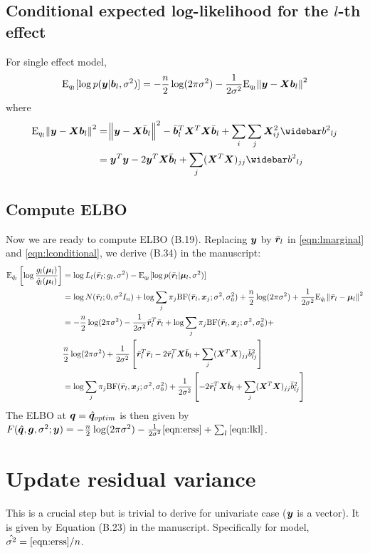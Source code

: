 \subsection{Conditional expected log-likelihood for the $l$-th effect}

For single effect model,
\begin{equation}
    \text{E}_{q_l}[\log p(\bm y|\bm b_l,\sigma^2)] = -\frac{n}{2}\log(2\pi\sigma^2) - \frac{1}{2\sigma^2}\text{E}_{q_l}\norm{\bm y - \bm X\bm b_l}^2  \label{eqn:lconditional}
\end{equation}
where
\begin{align}
    \E_{q_l}\norm{\vy - \mx\vb_l}^2 &= \norm{\vy - \mx \vbb_l}^2 - \vbb_l^T\mx^T\mx \vbb_l + \sum_i \sum_j \mx_{ij}^2 \bbb_{lj} \\
    &= \vy^T\vy -2 \vy^T \mx \vbb_l  + \sum_j (\mx^T \mx)_{jj} \bbb_{lj}
\end{align}

\subsection{Compute ELBO}
Now we are ready to compute ELBO (B.19).
Replacing $\bm y$ by $\bar{\bm r}_l$ in \eqref{eqn:lmarginal} and \eqref{eqn:lconditional}, we derive (B.34) in the manuscript:
\begin{align}
    \text{E}_{\hat{q}_l} \left[ \log \frac{g_l(\bm \mu_l)}{\hat{q}_l(\bm \mu_l)} \right] &= \log L_l(\bar{\bm r}_l; g_l,\sigma^2) - \text{E}_{q_l}[\log p(\bar{\bm r}_l|\bm \mu_l,\sigma^2)]  \\
    &= \log N(\bar{\bm r}_l; 0, \sigma^2 I_n) + \log \sum_j \pi_j \text{BF}(\bar{\bm r}_l, \bm x_j; \sigma^2, \sigma^2_0) + \frac{n}{2} \log(2\pi\sigma^2) +\frac{1}{2\sigma^2}\text{E}_{\hat{q}_l}\norm{\bar{\bm r}_l-\bm \mu_l}^2 \\
    &= -\frac{n}{2} \log(2\pi\sigma^2) -\frac{1}{2\sigma^2}\bar{\bm r}_l^T\bar{\bm r}_l + \log \sum_j \pi_j \text{BF}(\bar{\bm r}_l, \bm x_j; \sigma^2, \sigma^2_0) + \\
    & \frac{n}{2} \log(2\pi\sigma^2) +\frac{1}{2\sigma^2}\left[\bar{\bm r}_l^T\bar{\bm r}_l - 2\bar{\bm r}_l^T\bm X \bar{\bm b}_l + \sum_j (\bm X^T \bm X)_{jj} \bar{b}_{lj}^2 \right] \\
    &= \log \sum_j \pi_j \text{BF}(\bar{\bm r}_l, \bm x_j; \sigma^2, \sigma^2_0) + \frac{1}{2\sigma^2}\left[- 2\bar{\bm r}_l^T\bm X \bar{\bm b}_l + \sum_j (\bm X^T \bm X)_{jj} \bar{b}_{lj}^2\right] \label{eqn:lkl}
\end{align}
The ELBO at ${\bm q} = \hat{{\bm q}}_{optim}$ is then given by $F(\hat{{\bm q}},\bm g,\sigma^2; \bm y) = -\frac{n}{2} \log(2\pi\sigma^2) - \frac{1}{2\sigma^2} \eqref{eqn:erss} + \sum_l \eqref{eqn:lkl}$.

\section{Update residual variance}
This is a crucial step but is trivial to derive for univariate case ($\bm y$ is a vector). It is given by Equation (B.23) in the manuscript. Specifically for \susie model, $\hat{\sigma^2} = \eqref{eqn:erss}/n$.

